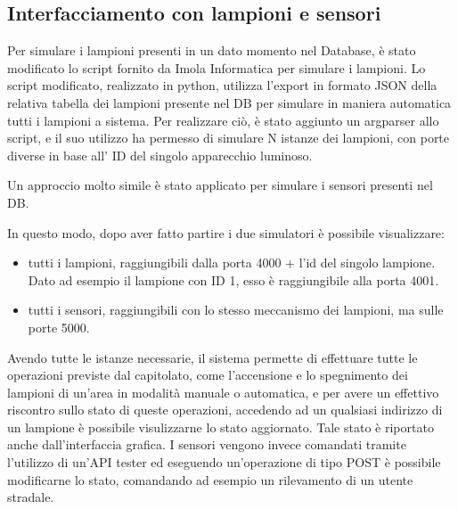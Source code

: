 \documentclass[12pt]{article}
\begin{document}
\subsection{Interfacciamento con lampioni e sensori}
Per simulare i lampioni presenti in un dato momento nel Database, è stato modificato lo script fornito da Imola Informatica per simulare i lampioni.
Lo script modificato, realizzato in python, utilizza l'export in formato JSON della relativa tabella dei lampioni presente nel DB per simulare in maniera automatica tutti i lampioni a sistema.
Per realizzare ciò, è stato aggiunto un argparser allo script, e il suo utilizzo ha permesso di simulare N istanze dei lampioni, con porte diverse in base all' ID del singolo apparecchio luminoso.

Un approccio molto simile è stato applicato per simulare i sensori presenti nel DB.

In questo modo, dopo aver fatto partire i due simulatori è possibile visualizzare:
\begin{itemize}
	\item tutti i lampioni, raggiungibili dalla porta 4000 + l'id del singolo lampione. Dato ad esempio il lampione con ID 1, esso è raggiungibile alla porta 4001.
	\item tutti i sensori, raggiungibili con lo stesso meccanismo dei lampioni, ma sulle porte 5000.
\end{itemize}

Avendo tutte le istanze necessarie, il sistema permette di effettuare tutte le operazioni previste dal capitolato, come l'accensione e lo spegnimento dei lampioni di un'area in modalità manuale o automatica, e per avere un effettivo riscontro sullo stato di queste operazioni, accedendo ad un qualsiasi indirizzo di un lampione è possibile visulizzarne lo stato aggiornato. Tale stato è riportato anche dall'interfaccia grafica.
I sensori vengono invece comandati tramite l'utilizzo di un'API tester ed eseguendo un'operazione di tipo POST è possibile modificarne lo stato, comandando ad esempio un rilevamento di un utente stradale.
\end{document}
